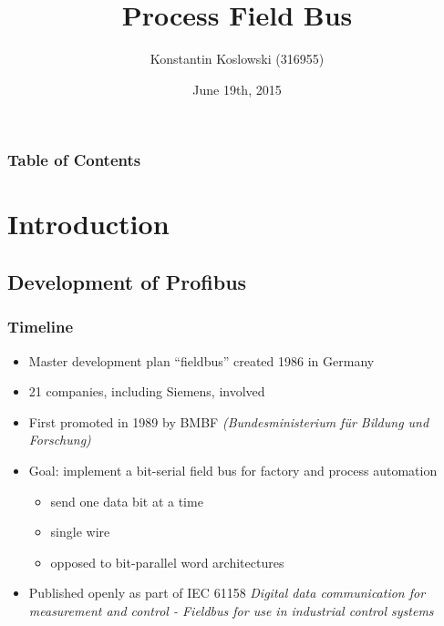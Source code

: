 \documentclass{beamer}
\title[Profibus]{\textbf{Pro}cess \textbf{Fi}eld \textbf{Bus}}
\author[Koslowski]{Konstantin Koslowski (316955)}
\institute[]
{TU Berlin \\
 Department of Telecommunication Systems \\
 Telecommunication Networks Group \\
}
\date{June 19th, 2015}
\begin{document}
\begin{frame}
  \titlepage
\end{frame}

\begin{frame}
\frametitle{Table of Contents}
\setcounter{tocdepth}{1}
\tableofcontents
\end{frame}

\section{Introduction}


\subsection{Development of Profibus}
\begin{frame}
\frametitle{Timeline}
\begin{itemize}
  \item Master development plan ``fieldbus'' created 1986 in Germany
  \item 21 companies, including Siemens, involved
  \item First promoted in 1989 by BMBF \textit{(Bundesministerium f\"ur Bildung und Forschung)}
  \item Goal: implement a bit-serial field bus for factory and process automation
    \begin{itemize}
      \item send one data bit at a time
      \item single wire
      \item opposed to bit-parallel word architectures
    \end{itemize}
  \item Published openly as part of IEC 61158 \textit{Digital data communication for measurement and
      control - Fieldbus for use in industrial control systems}
\end{itemize}
\end{frame}
\end{document}
